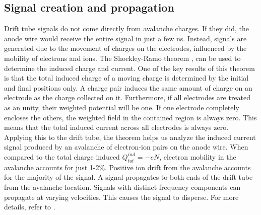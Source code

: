 \subsection{Signal creation and propagation}
Drift tube signals do not come directly from avalanche charges. 
If they did, the anode wire would receive the entire signal 
in just a few ns. Instead, signals are generated due to the 
movement of charges on the electrodes, influenced by the 
mobility of electrons and ions. The Shockley-Ramo 
theorem \cite{kola}, can be 
used to determine the induced charge and current. 
One of the key results of this theorem is that 
the total induced charge of a moving charge 
is determined by the initial and final positions only.  
A charge pair induces the same amount of 
charge on an electrode as the charge collected on it. 
Furthermore, if all electrodes are treated as 
an unity, their weighted potential will be one. 
If one electrode completely encloses the others, the 
weighted field in the contained region is always zero. 
This means that the total induced current across all 
electrodes is always zero.
Applying this to the drift tube, the theorem 
helps us analyze the induced current signal produced by an 
avalanche of electron-ion pairs on the anode wire. 
When compared to the total charge induced $Q^{ind}_{tot}= -eN$, 
electron mobility in the avalanche accounts for just 1-2\%. 
Positive ion drift from the avalanche accounts for the majority of the signal. 
A signal propagates to both ends of the drift tube from the avalanche location.
Signals with distinct frequency components can propagate at varying velocities. This causes the signal to disperse. 
For more details, refer to \cite{kola}.
